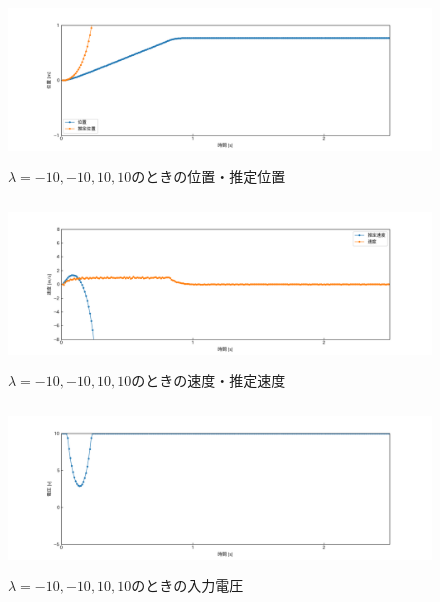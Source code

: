 \documentclass[12pt]{jsarticle}
\begin{document}
\begin{figure}[H]
  \begin{center}
    \includegraphics[clip,width=13.0cm, height=4.4cm]{../img/Exp6-1.png}
    \caption{$\lambda=-10, -10, 10, 10$のときの位置・推定位置}
    \label{Exp6-1}
  \end{center}
\end{figure}
\begin{figure}[H]
  \begin{center}
    \includegraphics[clip,width=13.0cm, height=4.4cm]{../img/Exp6-2.png}
    \caption{$\lambda=-10, -10, 10, 10$のときの速度・推定速度}
    \label{Exp6-2}
  \end{center}
\end{figure}
\begin{figure}[H]
  \begin{center}
    \includegraphics[clip,width=13.0cm, height=4.4cm]{../img/Exp6-3.png}
    \caption{$\lambda=-10, -10, 10, 10$のときの入力電圧}
    \label{Exp6-3}
  \end{center}
\end{figure}
\end{document}
